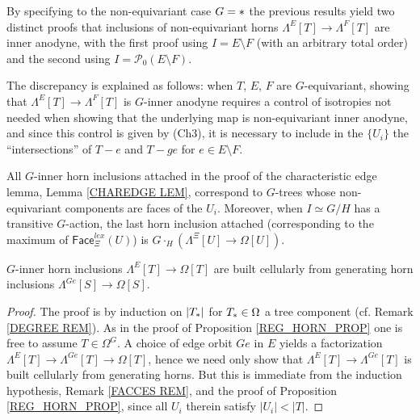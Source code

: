 \documentclass[a4paper,10pt
]{article}%
\begin{document}
\begin{remark}\label{TWOPROOF REM}
	By specifying to the non-equivariant case $G = \**$
	the previous results yield two distinct proofs
	that inclusions of non-equivariant horns
	$\Lambda^{E}[T] \to \Lambda^{F}[T]$
	are inner anodyne,
	with the first proof using $I = E \setminus F$ (with an arbitrary total order) and the second using 
	$I = \mathcal{P}_0(E \setminus F)$. 

	The discrepancy is explained as follows: 
	when $T$, $E$, $F$ are $G$-equivariant, showing that
	$\Lambda^{E}[T] \to \Lambda^{F}[T]$ 
	is $G$-inner anodyne requires a control of isotropies 
	not needed when showing that the underlying map is non-equivariant inner anodyne, and since this control is given by (Ch3), it is necessary to include in the $\{U_i\}$ the
	``intersections'' of $T-e$ and $T-ge$ for $e \in E \setminus F$. 
\end{remark}


\begin{remark}\label{FACCES REM}
All $G$-inner horn inclusions attached in the proof of the characteristic edge lemma, Lemma \ref{CHAREDGE LEM}, correspond to $G$-trees whose non-equivariant components are faces of the $U_i$. Moreover, when $I \simeq G/H$ has a transitive $G$-action, the last horn inclusion attached (corresponding to the maximum of $\mathsf{Face}^{lex}_{\Xi}(U)$) is
$G \cdot_H \left( \Lambda^{\Xi}[U] \to \Omega[U] \right)$.
\end{remark}


\begin{corollary}\label{REGGENHORN COR}
$G$-inner horn inclusions
$\Lambda^{E}[T] \to \Omega[T]$
are built cellularly from generating horn inclusions
$\Lambda^{Ge}[S] \to \Omega[S]$.
\end{corollary}

\begin{proof}
	The proof is by induction on $|T_{\**}|$ for $T_{\**}\in \Omega$ a tree component (cf. Remark \ref{DEGREE REM}). As in the proof of Proposition \ref{REG_HORN_PROP} one is free to assume $T \in \Omega^G$.	
	A choice of edge orbit $Ge$ in $E$ yields a factorization
	$\Lambda^{E}[T] \to \Lambda^{Ge}[T] \to \Omega[T]$,
	hence we need only show that 
	$\Lambda^{E}[T] \to \Lambda^{Ge}[T]$ is built cellularly from generating horns. 
	But this is immediate from the induction hypothesis,
	Remark \ref{FACCES REM}, and the proof of Proposition \ref{REG_HORN_PROP}, since all
	$U_{i}$ therein satisfy $|U_i|<|T|$.
\end{proof}
\end{document}
